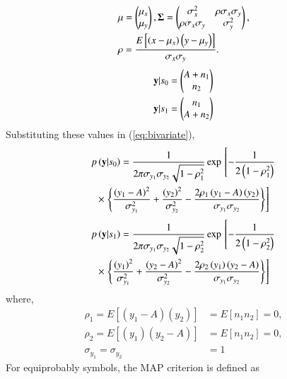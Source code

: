 \documentclass[journal,12pt,twocolumn]{IEEEtran}
\renewcommand\thesection{\arabic{section}}
\begin{document}
\begin{enumerate}[label=\thesection.\arabic*
,ref=\thesection.\theenumi]
\begin{align}
&\mbf{\mu}=
\begin{pmatrix*}
\mu_x \\
\mu_y
\end{pmatrix*},
\mbf{\Sigma} = 
\begin{pmatrix*}%
\sigma_x^2 & \rho\sigma_x\sigma_y \\
\rho\sigma_x\sigma_y & \sigma_y^2
\end{pmatrix*},\\
&\rho = \frac{E\sbrak{\brak{x - \mu_x}\brak{y-\mu_y}}}{\sigma_x\sigma_y}.
\end{align}
%
\begin{align}
    \mathbf{y}|s_0 &= 
    \begin{pmatrix}
    A+n_1 \\
    n_2
    \end{pmatrix}\\
    \mathbf{y}|s_1 &=  
    \begin{pmatrix}
    n_1 \\
    A+n_2
    \end{pmatrix}
    \end{align}
    Substituting these values in (\ref{eq:bivariate}),
    \begin{multline}
    \label{gauss_mutl_var1}
    p\left(\mathbf{y}|s_0\right) = \frac{1}{2\pi\sigma_{y_1}\sigma_{y_2}\sqrt{1-\rho_1^2}}\exp{}\left[-\frac{1}{2\left(1-\rho_1^2\right)}\right.
    \\
    \times {}\left.\left\{\frac{\left(y_1-A\right)^2}{\sigma_{y_1}^2}+\frac{\left(y_2\right)^2}{\sigma_{y_2}^2}-\frac{2\rho_1\left(y_1-A\right)\left(y_2\right)}{\sigma_{y_1}\sigma_{y_2}}\right\}\right]
    \end{multline}
    \begin{multline}
    \label{gauss_mutl_var2}
    p\left(\mathbf{y}|s_1\right) = \frac{1}{2\pi\sigma_{y_1}\sigma_{y_2}\sqrt{1-\rho_2^2}}\exp{}\left[-\frac{1}{2\left(1-\rho_2^2\right)}\right.
    \\
    \times {}\left.\left\{\frac{\left(y_1\right)^2}{\sigma_{y_1}^2}+\frac{\left(y_2-A\right)^2}{\sigma_{y_2}^2}-\frac{2\rho_2\left(y_1\right)\left(y_2-A\right)}{\sigma_{y_1}\sigma_{y_2}}\right\}\right]
    \end{multline}
    where,
    \begin{align}
    \label{rho_sig_val}
    \rho_1 = E[(y_1-A)(y_2)] &= E[n_1 n_2] = 0, \nonumber \\
    \rho_2 = E[(y_1)(y_2-A)] &= E[n_1 n_2] = 0, \nonumber \\
    \sigma_{y_1} = \sigma_{y_2} &= 1
    \end{align}
    For equiprobably symbols, the MAP criterion is defined as

\end{enumerate}
\end{document}
